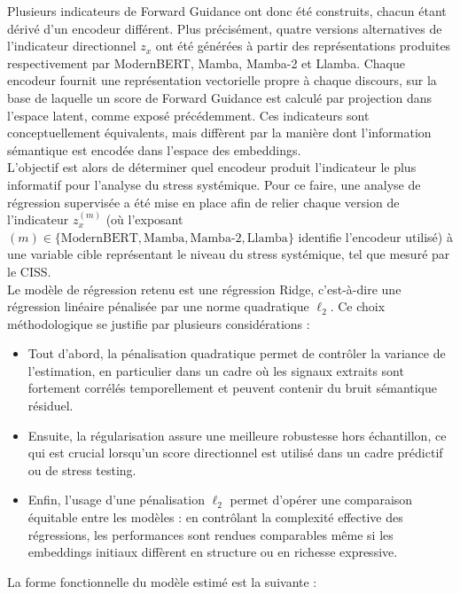 Plusieurs indicateurs de Forward Guidance ont donc été construits, chacun étant dérivé d’un encodeur différent. Plus précisément, quatre versions alternatives de l’indicateur directionnel $z_x$ ont été générées à partir des représentations produites respectivement par ModernBERT, Mamba, Mamba-2 et Llamba. Chaque encodeur fournit une représentation vectorielle propre à chaque discours, sur la base de laquelle un score de Forward Guidance est calculé par projection dans l’espace latent, comme exposé précédemment. Ces indicateurs sont conceptuellement équivalents, mais diffèrent par la manière dont l’information sémantique est encodée dans l’espace des embeddings.\\

L’objectif est alors de déterminer quel encodeur produit l’indicateur le plus informatif pour l’analyse du stress systémique. Pour ce faire, une analyse de régression supervisée a été mise en place afin de relier chaque version de l’indicateur $z_x^{(m)}$ (où l’exposant $(m) \in \{\text{ModernBERT}, \text{Mamba}, \text{Mamba-2}, \text{Llamba}\}$ identifie l’encodeur utilisé) à une variable cible représentant le niveau du stress systémique, tel que mesuré par le CISS.\\

Le modèle de régression retenu est une régression Ridge, c’est-à-dire une régression linéaire pénalisée par une norme quadratique $\ell_2$. Ce choix méthodologique se justifie par plusieurs considérations :
\begin{itemize}
\item Tout d’abord, la pénalisation quadratique permet de contrôler la variance de l’estimation, en particulier dans un cadre où les signaux extraits sont fortement corrélés temporellement et peuvent contenir du bruit sémantique résiduel.
\item Ensuite, la régularisation assure une meilleure robustesse hors échantillon, ce qui est crucial lorsqu’un score directionnel est utilisé dans un cadre prédictif ou de stress testing.
\item Enfin, l’usage d’une pénalisation $\ell_2$ permet d’opérer une comparaison équitable entre les modèles : en contrôlant la complexité effective des régressions, les performances sont rendues comparables même si les embeddings initiaux diffèrent en structure ou en richesse expressive.
\end{itemize}

La forme fonctionnelle du modèle estimé est la suivante :

